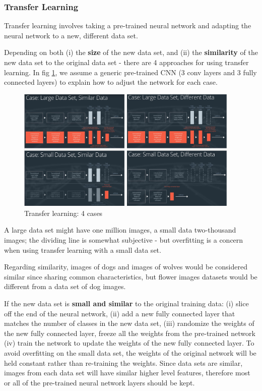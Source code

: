 \documentclass[11pt]{article}
\begin{document}
\subsubsection{Transfer Learning}
Transfer learning involves taking a pre-trained neural network and adapting the neural network to a new, different data set.

Depending on both (i) the \textbf{size} of the new data set, and (ii) the \textbf{similarity} of the new data set to the original data set - there are 4 approaches for using transfer learning. In fig \ref{transfer_learning_cases}, we assume a generic pre-trained CNN (3 conv layers and 3 fully connected layers) to explain how to adjust the network for each case.
\begin{figure}[htbp] 
	\centering
	\includegraphics[width=0.95\textwidth]{pics/transfer_learning_cases}
	\caption{Transfer learning: 4 cases} 
	\label{transfer_learning_cases}
\end{figure}

A large data set might have one million images, a small data two-thousand images; the dividing line is somewhat subjective - but overfitting is a concern when using transfer learning with a small data set.

Regarding similarity, images of dogs and images of wolves would be considered similar since sharing common characteristics, but flower images datasets would be different from a data set of dog images.

If the new data set is \textbf{small and similar} to the original training data: (i) slice off the end of the neural network, (ii) add a new fully connected layer that matches the number of classes in the new data set, (iii)
randomize the weights of the new fully connected layer, freeze all the weights from the pre-trained network (iv) train the network to update the weights of the new fully connected layer. To avoid overfitting on the small data set, the weights of the original network will be held constant rather than re-training the weights. Since data sets are similar, images from each data set will have similar higher level features, therefore most or all of the pre-trained neural network layers should be kept.
\end{document}
